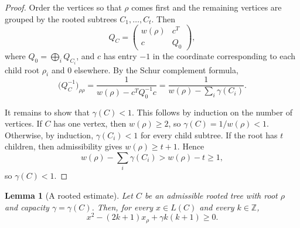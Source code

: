 \documentclass[12pt]{article}
\newtheorem{lemma}{Lemma}
\begin{document}
\begin{proof}
Order the vertices so that \(\rho\) comes first and the remaining vertices are grouped by the rooted subtrees \(C_1,\dots,C_t\). Then
\[
Q_C=
\begin{pmatrix}
w(\rho) & c^T\\
c & Q_0
\end{pmatrix},
\]
where \(Q_0=\bigoplus_i Q_{C_i}\), and \(c\) has entry \(-1\) in the coordinate corresponding to each child root \(\rho_i\) and \(0\) elsewhere. By the Schur complement formula,
\[
\bigl(Q_C^{-1}\bigr)_{\rho\rho}
=
\frac{1}{w(\rho)-c^TQ_0^{-1}c}
=
\frac{1}{w(\rho)-\sum_i \gamma(C_i)}.
\]

It remains to show that \(\gamma(C)<1\). This follows by induction on the number of vertices. If \(C\) has one vertex, then \(w(\rho)\ge 2\), so \(\gamma(C)=1/w(\rho)<1\). Otherwise, by induction, \(\gamma(C_i)<1\) for every child subtree. If the root has \(t\) children, then admissibility gives \(w(\rho)\ge t+1\). Hence
\[
w(\rho)-\sum_i \gamma(C_i)>w(\rho)-t\ge 1,
\]
so \(\gamma(C)<1\).
\end{proof}

\begin{lemma}[A rooted estimate]
Let \(C\) be an admissible rooted tree with root \(\rho\) and capacity \(\gamma=\gamma(C)\). Then, for every \(x\in L(C)\) and every \(k\in \mathbb Z\),
\[
x^2-(2k+1)x_\rho+\gamma k(k+1)\ge 0.
\]
\end{lemma}
\end{document}
